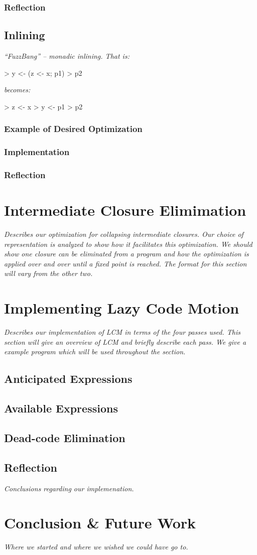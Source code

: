 \documentclass[12pt]{report}
\begin{document}
\subsection{Reflection}

\section{Inlining}
\emph{``FuzzBang'' --  monadic inlining. That is:}

> y <- (z <- x; p1)
> p2

\noindent
\emph{becomes:}

> z <- x
> y <- p1
> p2

\subsection{Example of Desired Optimization}
\subsection{Implementation}
\subsection{Reflection}

\chapter{Intermediate Closure Elimimation}
\emph{Describes our optimization for collapsing intermediate
closures. Our choice of representation is analyzed to
show how it facilitates this optimization. We should show one
closure can be eliminated from a program and how the optimization
is applied over and over until a fixed point is reached. The format
for this section will vary from the other two.}

\chapter{Implementing Lazy Code Motion}
\emph{Describes our implementation of LCM in terms of the four passes
  used. This section will give an overview of LCM and briefly describe
  each pass. We give a example program which will be used throughout
  the section.}

\section{Anticipated Expressions}

\section{Available Expressions}

\section{Dead-code Elimination}

\section{Reflection}

\emph{Conclusions regarding our implemenation.}

\chapter{Conclusion \& Future Work}

\emph{Where we started and where we wished we could have go to.}
\end{document}
